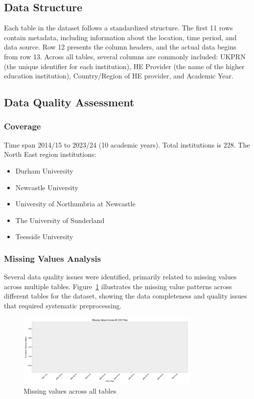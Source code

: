 \documentclass[journal,onecolumn, 10pt,draftclsnofoot]{IEEEtran}
\begin{document}
\subsection{Data Structure}
Each table in the dataset follows a standardized structure. The first 11 rows contain metadata, including information about the location, time period, and data source. Row 12 presents the column headers, and the actual data begins from row 13. Across all tables, several columns are commonly included: UKPRN (the unique identifier for each institution), HE Provider (the name of the higher education institution), Country/Region of HE provider, and Academic Year.

\subsection{Data Quality Assessment}

\subsubsection{Coverage}
Time span 2014/15 to 2023/24 (10 academic years). Total institutions is 228. The North East region institutions:
\begin{itemize}
    \item Durham University
    \item Newcastle University
    \item University of Northumbria at Newcastle
    \item The University of Sunderland
    \item Teesside University
\end{itemize}

\subsubsection{Missing Values Analysis}

Several data quality issues were identified, primarily related to missing values across multiple tables. Figure~\ref{fig:missing-values} illustrates the missing value patterns across different tables for the dataset, showing the data completeness and quality issues that required systematic preprocessing.

\begin{figure}[h]
\centering
\includegraphics[width=0.8\textwidth]{Fig/figure1.missing_values_comparison.png}
\caption{Missing values across all tables}
\label{fig:missing-values}
\end{figure}
\end{document}
